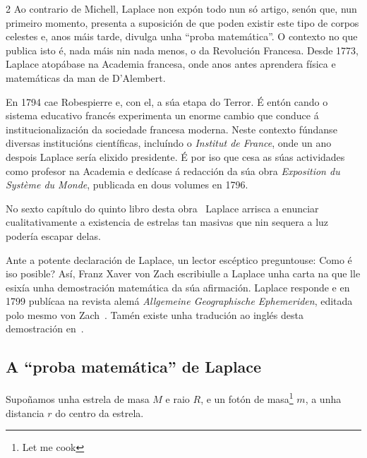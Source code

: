 \begin{multicols}{2}
Ao contrario de Michell, Laplace non expón todo nun só artigo, senón que, nun
primeiro momento, presenta a suposición de que poden existir este tipo de
corpos celestes e, anos máis tarde, divulga unha ``proba matemática''. O
contexto no que publica isto é, nada máis nin nada menos, o da Revolución
Francesa. Desde 1773, Laplace atopábase na Academia francesa, onde anos antes
aprendera física e matemáticas da man de D'Alembert.

En 1794 cae Robespierre e, con el, a súa etapa do Terror. É entón cando o
sistema educativo francés experimenta un enorme cambio que conduce á
institucionalización da sociedade francesa moderna. Neste contexto fúndanse
diversas institucións científicas, incluíndo o \textit{Institut de France},
onde un ano despois Laplace sería elixido presidente. É por iso que cesa as
súas actividades como profesor na Academia e dedícase á redacción da súa obra
\textit{Exposition du Système du Monde}, publicada en dous volumes en 1796.

No sexto capítulo do quinto libro desta obra~\cite[página
348]{exposition_laplace} Laplace arrisca a enunciar cualitativamente a
existencia de estrelas tan masivas que nin sequera a luz podería escapar
delas. %


Ante a potente declaración de Laplace, un lector escéptico preguntouse: Como é
iso posible? Así, Franz Xaver von Zach escribiulle a Laplace unha carta na que
lle esixía unha demostración matemática da súa afirmación. Laplace responde e
en 1799 publícaa na revista alemá \textit{Allgemeine Geographische
Ephemeriden}, editada polo mesmo von Zach~\cite{laplace_original}. Tamén
existe unha tradución ao inglés desta demostración en~\cite{hawking_ellis}.

\subsection*{A ``proba matemática'' de Laplace}

Supoñamos unha estrela de masa $M$ e raio $R$, e un fotón de masa\footnote{Let
me cook} $m$, a unha distancia $r$ do centro da estrela.


\end{multicols}
